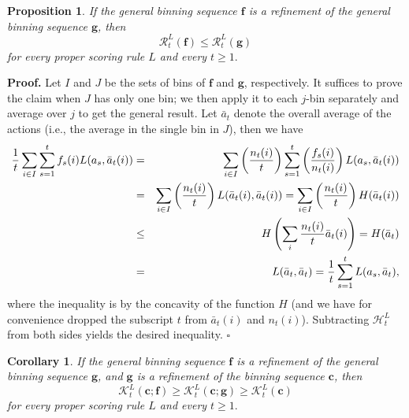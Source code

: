 \documentclass[12pt,a4paper,notitlepage]{article}
\newtheorem{corollary}[theorem]{Corollary}
\newtheorem{proposition}[theorem]{Proposition}
\newenvironment{proof}[1][Proof]{\noindent\textbf{#1.} }{\hfill $\square$}
\begin{document}
\begin{proposition}
\label{p:refine-S}If the general binning sequence $\mathbf{f}$ is a
refinement of the general binning sequence $\mathbf{g}$, then%
\begin{equation*}
\mathcal{R}_{t}^{L}(\mathbf{f})\leq \mathcal{R}_{t}^{L}(\mathbf{g})
\end{equation*}%
for every proper scoring rule $L$ and every $t\geq 1.$
\end{proposition}

\begin{proof}
Let $I$ and $J$ be the sets of bins of $\mathbf{f}$ and $\mathbf{g}$,
respectively. It suffices to prove the claim when $J$ has only one bin; we
then apply it to each $j$-bin separately and average over $j$ to get the
general result. Let $\bar{a}_{t}$ denote the overall average of the actions
(i.e., the average in the single bin in $J$), then we have%
\begin{eqnarray*}
\frac{1}{t}\sum_{i\in I}\sum_{s=1}^{t}f_{s}(i)L(a_{s},\bar{a}_{t}(i))
&=&\sum_{i\in I}\left( \frac{n_{t}(i)}{t}\right) \sum_{s=1}^{t}\left( \frac{%
f_{s}(i)}{n_{t}(i)}\right) L(a_{s},\bar{a}_{t}(i)) \\
&=&\sum_{i\in I}\left( \frac{n_{t}(i)}{t}\right) L(\bar{a}_{t}(i),\bar{a}%
_{t}(i))=\sum_{i\in I}\left( \frac{n_{t}(i)}{t}\right) H(\bar{a}_{t}(i)) \\
&\leq &H\left( \sum_{i}\frac{n_{t}(i)}{t}\bar{a}_{t}(i)\right) =H(\bar{a}%
_{t}) \\
&=&L(\bar{a}_{t},\bar{a}_{t})=\frac{1}{t}\sum_{s=1}^{t}L(a_{s},\bar{a}_{t}),
\end{eqnarray*}%
where the inequality is by the concavity of the function $H$ (and we have
for convenience dropped the subscript $t$ from $\bar{a}_{t}(i)$ and $%
n_{t}(i) $). Subtracting $\mathcal{H}_{t}^{L}$ from both sides yields the
desired inequality.
\end{proof}

\bigskip

\begin{corollary}
\label{c:refine-S}If the general binning sequence $\mathbf{f}$ is a
refinement of the general binning sequence $\mathbf{g}$, and $\mathbf{g}$ is
a refinement of the binning sequence $\mathbf{c}$, then%
\begin{equation*}
\mathcal{K}_{t}^{L}(\mathbf{c};\mathbf{f})\geq \mathcal{K}_{t}^{L}(\mathbf{c}%
;\mathbf{g})\geq \mathcal{K}_{t}^{L}(\mathbf{c})
\end{equation*}%
for every proper scoring rule $L$ and every $t\geq 1.$
\end{corollary}
\end{document}
